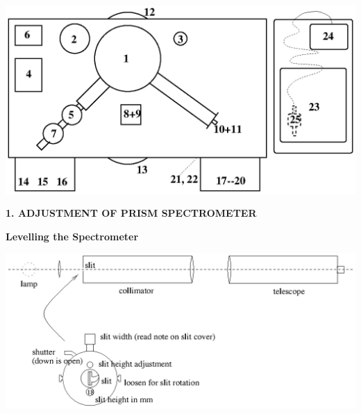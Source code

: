 \documentclass[12pt]{article}
\begin{document}
\begin{center}
\includegraphics{ap3labbench.ps}
\end{center}

\newpage

{\bf 1. ADJUSTMENT OF PRISM SPECTROMETER}

{\bf Levelling the Spectrometer}

\begin{center}
\includegraphics{ap3labspec0.ps}
\end{center}
\end{document}
